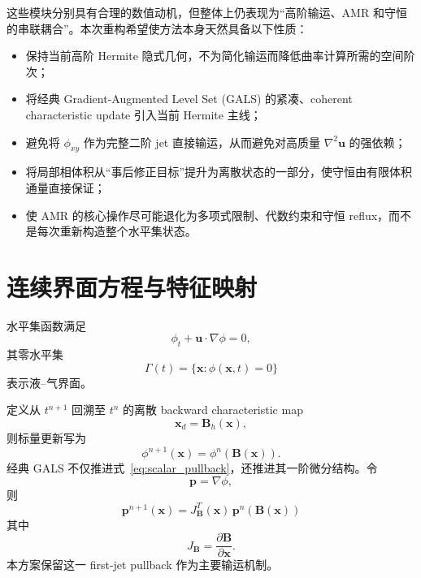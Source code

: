 \documentclass[11pt,a4paper]{ctexart}
\newcommand{\bx}{\bm{x}}
\newcommand{\bu}{\bm{u}}
\newcommand{\bB}{\bm{B}}
\newcommand{\bp}{\bm{p}}
\newcommand{\grad}{\nabla}
\begin{document}
这些模块分别具有合理的数值动机，但整体上仍表现为“高阶输运、AMR 和守恒的串联耦合”。本次重构希望使方法本身天然具备以下性质：
\begin{itemize}
    \item 保持当前高阶 Hermite 隐式几何，不为简化输运而降低曲率计算所需的空间阶次；
    \item 将经典 Gradient-Augmented Level Set (GALS) 的紧凑、coherent characteristic update 引入当前 Hermite 主线；
    \item 避免将 $\phi_{xy}$ 作为完整二阶 jet 直接输运，从而避免对高质量 $\nabla^2\bu$ 的强依赖；
    \item 将局部相体积从“事后修正目标”提升为离散状态的一部分，使守恒由有限体积通量直接保证；
    \item 使 AMR 的核心操作尽可能退化为多项式限制、代数约束和守恒 reflux，而不是每次重新构造整个水平集状态。
\end{itemize}

\section{连续界面方程与特征映射}

水平集函数满足
\begin{equation}
    \phi_t+\bu\cdot\grad\phi=0,
    \label{eq:ls}
\end{equation}
其零水平集
\begin{equation}
    \Gamma(t)=\{\bx:\phi(\bx,t)=0\}
\end{equation}
表示液--气界面。

定义从 $t^{n+1}$ 回溯至 $t^n$ 的离散 backward characteristic map
\begin{equation}
    \bx_d=\bB_h(\bx),
\end{equation}
则标量更新写为
\begin{equation}
    \phi^{n+1}(\bx)=\phi^n(\bB(\bx)).
    \label{eq:scalar_pullback}
\end{equation}
经典 GALS 不仅推进式~\eqref{eq:scalar_pullback}，还推进其一阶微分结构。令
\begin{equation}
    \bp=\grad\phi,
\end{equation}
则
\begin{equation}
    \boxed{
    \bp^{n+1}(\bx)=J_{\bB}^{T}(\bx)\,\bp^n(\bB(\bx))
    }
    \label{eq:firstjet}
\end{equation}
其中
\begin{equation}
    J_{\bB}=\frac{\partial\bB}{\partial\bx}.
\end{equation}
本方案保留这一 first-jet pullback 作为主要输运机制。
\end{document}
